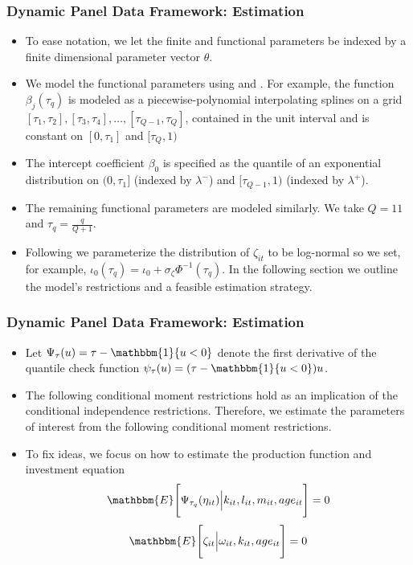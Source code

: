 \documentclass{beamer}
\begin{document}

\begin{frame}
\frametitle{Dynamic Panel Data Framework: Estimation}
\begin{itemize}
	\item To ease notation, we let the finite and functional parameters be indexed by a finite dimensional parameter vector $\theta$. 
	\item We model the functional parameters using \cite{Wei2009} and \cite{Arellano2016}. For example, the function $\beta_{j}(\tau_{q})$ is modeled as a piecewise-polynomial interpolating splines on a grid $[\tau_{1},\tau_{2}], [\tau_{3},\tau_{4}],\dots, [\tau_{Q-1},\tau_{Q}]$, contained in the unit interval and is constant on $[0, \tau_{1}]$ and $[\tau_{Q}, 1)$ 
	\item The intercept coefficient $\beta_{0}$ is specified as the quantile of an exponential distribution on $(0,\tau_{1}]$ (indexed by $\lambda^{-}$) and $[\tau_{Q-1}, 1)$ (indexed by $\lambda^{+}$). 
	\item The remaining functional parameters are modeled similarly. We take $Q=11$ and $\tau_{q}=\frac{q}{Q+1}$. 
	\item Following \cite{Arellano2017} we parameterize the distribution of $\zeta_{it}$ to be log-normal so we set, for example, $\iota_{0}(\tau_{q})=\iota_{0}+\sigma_{\zeta}\Phi^{-1}(\tau_{q})$. In the following section we outline the model's restrictions and a feasible estimation strategy.
\end{itemize}
\end{frame}


\begin{frame}
\frametitle{Dynamic Panel Data Framework: Estimation}
\begin{itemize}
	\item Let $\Psi_{\tau}(u)=\tau-\mathbbm{1}\{u<0\}$ denote the first derivative of the quantile check function $\psi_{\tau}(u)=(\tau-\mathbbm{1}\{u<0\})u$. 
	\item The following conditional moment restrictions hold as an implication of the conditional independence restrictions. Therefore, we estimate the parameters of interest from the following conditional moment restrictions.
	\item To fix ideas, we focus on how to estimate the production function and investment equation
	\begin{equation}\label{ymoment}
	\mathbbm{E}\Bigg[\Psi_{\tau_{q}}(\eta_{it})\Big|k_{it}, l_{it}, m_{it}, age_{it}\Bigg]=0
	\end{equation}
	\begin{equation}\label{iemoment}
	\mathbbm{E}\Bigg[\zeta_{it}\Big|\omega_{it}, k_{it}, age_{it}\Bigg]=0
	\end{equation}
\end{itemize}
\end{frame}
\end{document}
